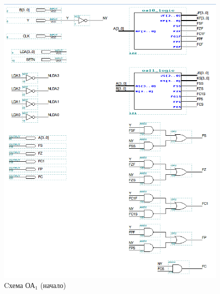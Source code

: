 \begin{figure}[H]
	\includegraphics[scale=0.6]{images/altera/oa1_1.png}
	\caption{Cхема ОА$_{1}$ (начало)}
	\label{figure:oa1-1log}
\end{figure}


